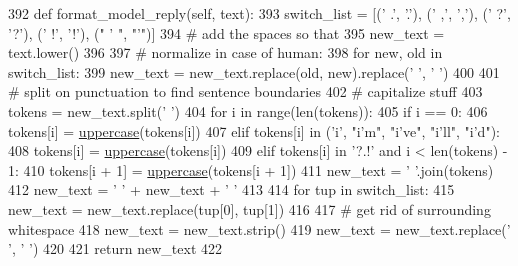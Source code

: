 \begin{DoxyCode}
392     \textcolor{keyword}{def }format\_model\_reply(self, text):
393         switch\_list = [(\textcolor{stringliteral}{' .'}, \textcolor{stringliteral}{'.'}), (\textcolor{stringliteral}{' ,'}, \textcolor{stringliteral}{','}), (\textcolor{stringliteral}{' ?'}, \textcolor{stringliteral}{'?'}), (\textcolor{stringliteral}{' !'}, \textcolor{stringliteral}{'!'}), (\textcolor{stringliteral}{" ' "}, \textcolor{stringliteral}{"'"})]
394         \textcolor{comment}{# add the spaces so that}
395         new\_text = text.lower()
396 
397         \textcolor{comment}{# normalize in case of human:}
398         \textcolor{keywordflow}{for} new, old \textcolor{keywordflow}{in} switch\_list:
399             new\_text = new\_text.replace(old, new).replace(\textcolor{stringliteral}{'  '}, \textcolor{stringliteral}{' '})
400 
401         \textcolor{comment}{# split on punctuation to find sentence boundaries}
402         \textcolor{comment}{# capitalize stuff}
403         tokens = new\_text.split(\textcolor{stringliteral}{' '})
404         \textcolor{keywordflow}{for} i \textcolor{keywordflow}{in} range(len(tokens)):
405             \textcolor{keywordflow}{if} i == 0:
406                 tokens[i] = \hyperlink{namespaceprojects_1_1controllable__dialogue_1_1mturk_1_1worlds_a661f3cc70180bbd2379e66e5844f7900}{uppercase}(tokens[i])
407             \textcolor{keywordflow}{elif} tokens[i] \textcolor{keywordflow}{in} (\textcolor{stringliteral}{'i'}, \textcolor{stringliteral}{"i'm"}, \textcolor{stringliteral}{"i've"}, \textcolor{stringliteral}{"i'll"}, \textcolor{stringliteral}{"i'd"}):
408                 tokens[i] = \hyperlink{namespaceprojects_1_1controllable__dialogue_1_1mturk_1_1worlds_a661f3cc70180bbd2379e66e5844f7900}{uppercase}(tokens[i])
409             \textcolor{keywordflow}{elif} tokens[i] \textcolor{keywordflow}{in} \textcolor{stringliteral}{'?.!'} \textcolor{keywordflow}{and} i < len(tokens) - 1:
410                 tokens[i + 1] = \hyperlink{namespaceprojects_1_1controllable__dialogue_1_1mturk_1_1worlds_a661f3cc70180bbd2379e66e5844f7900}{uppercase}(tokens[i + 1])
411         new\_text = \textcolor{stringliteral}{' '}.join(tokens)
412         new\_text = \textcolor{stringliteral}{' '} + new\_text + \textcolor{stringliteral}{' '}
413 
414         \textcolor{keywordflow}{for} tup \textcolor{keywordflow}{in} switch\_list:
415             new\_text = new\_text.replace(tup[0], tup[1])
416 
417         \textcolor{comment}{# get rid of surrounding whitespace}
418         new\_text = new\_text.strip()
419         new\_text = new\_text.replace(\textcolor{stringliteral}{'  '}, \textcolor{stringliteral}{' '})
420 
421         \textcolor{keywordflow}{return} new\_text
422 
\end{DoxyCode}

